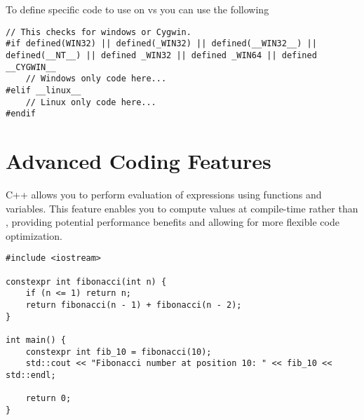 To define specific code to use on  vs  you can use the following
\begin{lstlisting}
// This checks for windows or Cygwin.
#if defined(WIN32) || defined(_WIN32) || defined(__WIN32__) || defined(__NT__) || defined _WIN32 || defined _WIN64 || defined __CYGWIN__
	// Windows only code here...
#elif __linux__
	// Linux only code here...
#endif
\end{lstlisting}



























\section{Advanced Coding Features}

C++ allows you to perform  evaluation of expressions using  functions and variables. This feature enables you to compute values at compile-time rather than , providing potential performance benefits and allowing for more flexible code optimization.
\begin{lstlisting}
#include <iostream>

constexpr int fibonacci(int n) {
    if (n <= 1) return n;
    return fibonacci(n - 1) + fibonacci(n - 2);
}

int main() {
    constexpr int fib_10 = fibonacci(10);
    std::cout << "Fibonacci number at position 10: " << fib_10 << std::endl;

    return 0;
}
\end{lstlisting}









\subsubsection{ }


